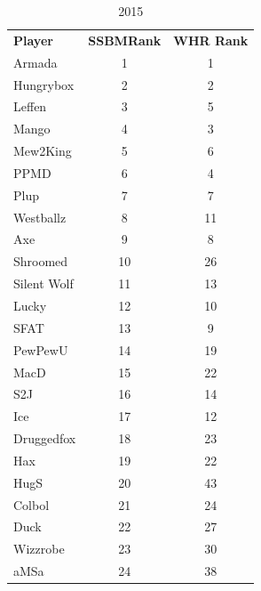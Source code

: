 \documentclass[10pt]{article}
\theoremstyle{definition}
\theoremstyle{remark}
\begin{document}
\begin{table}[!ht]
{}
    \parbox{.35\textwidth}{
        \centering
    \caption{2015}
    \begin{tabular}{lcc}
    \textbf{Player} & \textbf{SSBMRank} & \textbf{WHR Rank} \\
    Armada          & 1                      & 1        \\
    Hungrybox       & 2                      & 2        \\
    Leffen          & 3                      & 5        \\
    Mango           & 4                      & 3        \\
    Mew2King        & 5                      & 6        \\
    PPMD            & 6                      & 4        \\
    Plup            & 7                      & 7        \\
    Westballz       & 8                      & 11       \\
    Axe             & 9                      & 8        \\
    Shroomed        & 10                     & 26       \\
    Silent Wolf     & 11                     & 13       \\
    Lucky           & 12                     & 10       \\
    SFAT            & 13                     & 9        \\
    PewPewU         & 14                     & 19       \\
    MacD            & 15                     & 22       \\
    S2J             & 16                     & 14       \\
    Ice             & 17                     & 12       \\
    Druggedfox      & 18                     & 23       \\
    Hax             & 19                     & 22       \\
    HugS            & 20                     & 43       \\
    Colbol          & 21                     & 24       \\
    Duck            & 22                     & 27       \\
    Wizzrobe        & 23                     & 30       \\
    aMSa            & 24                     & 38       \\

\end{tabular}}
\end{table}
\end{document}
